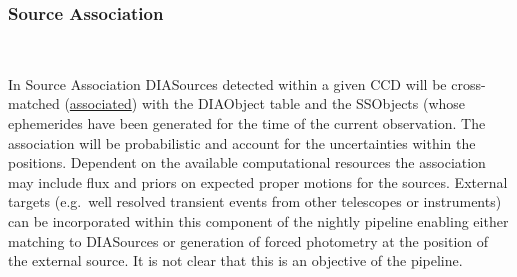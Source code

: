 \subsubsection{Source Association}~

In Source Association DIASources detected within a given CCD will be cross-matched (\hyperref[sec:acDIAObjectGeneration]{associated}) with the DIAObject table and the SSObjects (whose ephemerides have been generated for the time of the current observation. The association will be probabilistic  and account for the uncertainties within the positions. Dependent on the available computational resources the association may include flux and priors on expected proper motions for the sources. External targets (e.g.\ well resolved transient events from other telescopes or instruments) can be incorporated within this component of the nightly pipeline enabling either matching to DIASources or generation of forced photometry at the position of the external source. It is not clear that this is an objective of the pipeline. 


